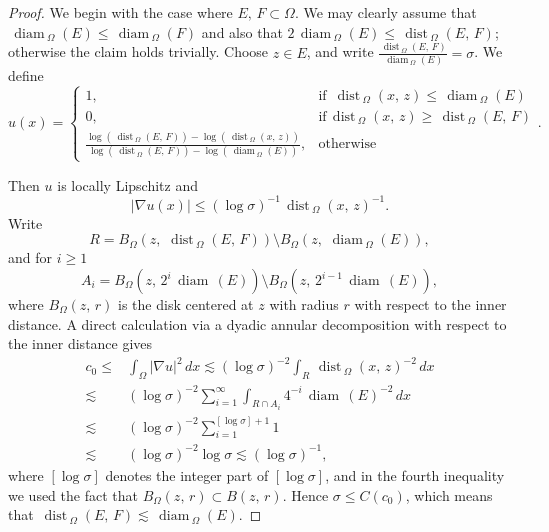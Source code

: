 \documentclass[reqno,11pt]{amsart}
\def\dist{{\mathop\mathrm{\,dist\,}}}
\def\ls{\lesssim}
\def\diam{{\mathop\mathrm{\,diam\,}}}
\numberwithin{equation}{section}
\theoremstyle{remark}
\begin{document}
\begin{proof}
We begin with the case where $E,\,F\subset \Omega$. 
We may clearly assume that $\diam_{\Omega}(E)\le \diam_{\Omega}(F)$ and also that
$2\diam_{\Omega}(E) \le \dist_{\Omega}(E,\,F)$; otherwise the claim holds trivially. 
Choose $z\in E$, and write $\frac{\dist_{\Omega}(E,\,F)}{\diam_{\Omega}(E)}=\sigma$. 
We define
$$ u(x)=
 \begin{cases}
   1, & \text{if } \dist_{\Omega}(x,\,z)\le \diam_{\Omega}(E) \\
  0, & \text{if}  \dist_{\Omega}(x,\,z)\ge \dist_{\Omega}(E,\,F)\\
      \frac {\log (\dist_{\Omega}(E,\,F))-\log (\dist_{\Omega}(x,\,z))}{\log (\dist_{\Omega}(E,\,F))-\log (\diam_{\Omega}(E))}, &\text{otherwise }
 \end{cases}.$$

Then $u$ is locally Lipschitz and 
$$|\nabla u(x)|\le (\log \sigma)^{-1} \dist_{\Omega}(x,\,z)^{-1}.$$
Write
$$R=B_{\Omega}(z,\,\dist_{\Omega}(E,\,F))\setminus B_{\Omega}(z,\,\diam_{\Omega}(E)),$$
and for $i\ge 1$
$$A_i=B_{\Omega}(z,\,2^{i}\diam(E))\setminus B_{\Omega}(z,\,2^{i-1}\diam(E)),$$
where $B_{\Omega}(z,\,r)$ is the disk centered at $z$ with radius $r$ with respect to the inner distance. 
A direct calculation via a dyadic annular decomposition with respect
to the inner distance gives
\begin{align*}
c_0\le & \int_{\Omega} |\nabla u|^2\, dx  
\ls   (\log \sigma)^{-2}\int_{R} \dist_{\Omega}(x,\,z)^{-2} \, dx\\ 
\ls &   (\log \sigma)^{-2} \sum_{i=1}^{\infty}\int_{R\cap A_i } 4^{-i}\diam(E)^{-2} \, dx\\
\ls &   (\log \sigma)^{-2} \sum_{i=1}^{[\log \sigma]+1} 1\\
\ls &  (\log \sigma)^{-2} \log \sigma \lesssim  {(\log \sigma)}^{-1}, 
\end{align*}
where  $[\log \sigma]$ denotes the integer part of $[\log \sigma]$, and in the fourth inequality we used the fact that $B_{\Omega}(z,\,r)\subset B(z,\,r)$. 
Hence $\sigma\le C(c_0)$, which means that $\dist_{\Omega}(E,\,F) \lesssim \diam_{\Omega}(E)$. 



\end{proof}
\end{document}
